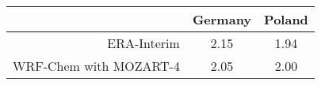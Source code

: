 {\renewcommand{\arraystretch}{1.2}
\begin{tabular}{r|c|c}
	\hline\hline
    & \textbf{Germany} & \textbf{Poland} \\
	\hline\hline
	 ERA-Interim & 2.15 & 1.94 \\
	 WRF-Chem with MOZART-4 & 2.05 & 2.00 \\
	\hline\hline
\end{tabular}}
